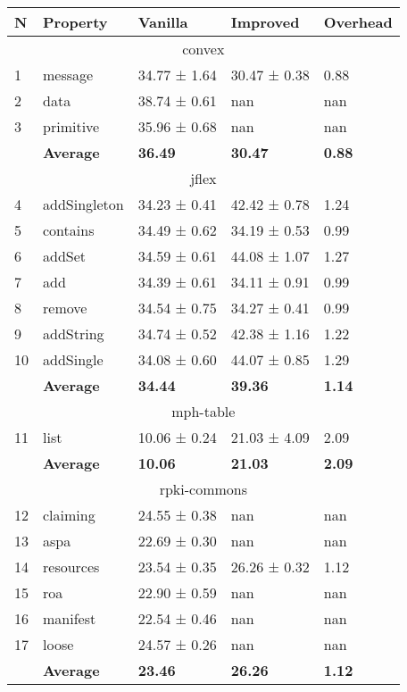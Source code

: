 \begin{tabular}{lllll}
N & Property & Vanilla & Improved & Overhead \\
\hline
\multicolumn{5}{c}{convex} \\
\hline
1 & message & 34.77 ± 1.64 & 30.47 ± 0.38 & 0.88 \\
2 & data & 38.74 ± 0.61 & nan & nan \\
3 & primitive & 35.96 ± 0.68 & nan & nan \\
\textbf{} & \textbf{Average} & \textbf{36.49} & \textbf{30.47} & \textbf{0.88} \\
\hline
\multicolumn{5}{c}{jflex} \\
\hline
4 & addSingleton & 34.23 ± 0.41 & 42.42 ± 0.78 & 1.24 \\
5 & contains & 34.49 ± 0.62 & 34.19 ± 0.53 & 0.99 \\
6 & addSet & 34.59 ± 0.61 & 44.08 ± 1.07 & 1.27 \\
7 & add & 34.39 ± 0.61 & 34.11 ± 0.91 & 0.99 \\
8 & remove & 34.54 ± 0.75 & 34.27 ± 0.41 & 0.99 \\
9 & addString & 34.74 ± 0.52 & 42.38 ± 1.16 & 1.22 \\
10 & addSingle & 34.08 ± 0.60 & 44.07 ± 0.85 & 1.29 \\
\textbf{} & \textbf{Average} & \textbf{34.44} & \textbf{39.36} & \textbf{1.14} \\
\hline
\multicolumn{5}{c}{mph-table} \\
\hline
11 & list & 10.06 ± 0.24 & 21.03 ± 4.09 & 2.09 \\
\textbf{} & \textbf{Average} & \textbf{10.06} & \textbf{21.03} & \textbf{2.09} \\
\hline
\multicolumn{5}{c}{rpki-commons} \\
\hline
12 & claiming & 24.55 ± 0.38 & nan & nan \\
13 & aspa & 22.69 ± 0.30 & nan & nan \\
14 & resources & 23.54 ± 0.35 & 26.26 ± 0.32 & 1.12 \\
15 & roa & 22.90 ± 0.59 & nan & nan \\
16 & manifest & 22.54 ± 0.46 & nan & nan \\
17 & loose & 24.57 ± 0.26 & nan & nan \\
\textbf{} & \textbf{Average} & \textbf{23.46} & \textbf{26.26} & \textbf{1.12} \\
\end{tabular}
